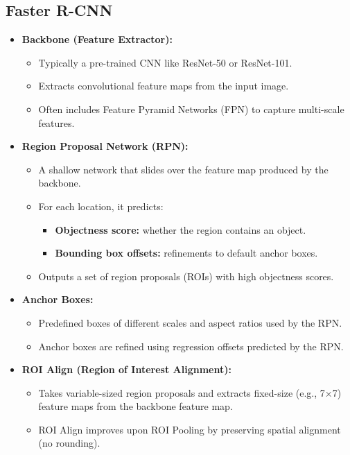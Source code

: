 \documentclass[12pt,a4paper]{article}
\begin{document}
\subsection{Faster R-CNN}
\begin{itemize}
    \item \textbf{Backbone (Feature Extractor):}
    \begin{itemize}
        \item Typically a pre-trained CNN like ResNet-50 or ResNet-101.
        \item Extracts convolutional feature maps from the input image.
        \item Often includes Feature Pyramid Networks (FPN) to capture multi-scale features.
    \end{itemize}

    \item \textbf{Region Proposal Network (RPN):}
    \begin{itemize}
        \item A shallow network that slides over the feature map produced by the backbone.
        \item For each location, it predicts:
        \begin{itemize}
            \item \textbf{Objectness score:} whether the region contains an object.
            \item \textbf{Bounding box offsets:} refinements to default anchor boxes.
        \end{itemize}
        \item Outputs a set of region proposals (ROIs) with high objectness scores.
    \end{itemize}

    \item \textbf{Anchor Boxes:}
    \begin{itemize}
        \item Predefined boxes of different scales and aspect ratios used by the RPN.
        \item Anchor boxes are refined using regression offsets predicted by the RPN.
    \end{itemize}

    \item \textbf{ROI Align (Region of Interest Alignment):}
    \begin{itemize}
        \item Takes variable-sized region proposals and extracts fixed-size (e.g., 7×7) feature maps from the backbone feature map.
        \item ROI Align improves upon ROI Pooling by preserving spatial alignment (no rounding).
    \end{itemize}


\end{itemize}
\end{document}
